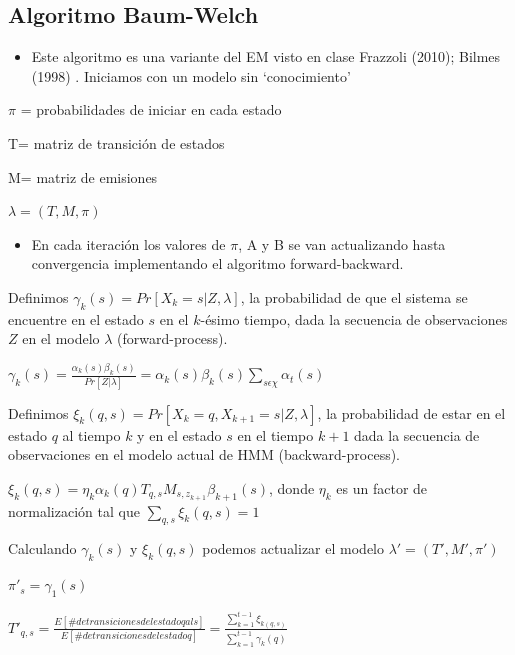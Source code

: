 \documentclass[]{article}
\begin{document}
\subsection{Algoritmo Baum-Welch}\label{algoritmo-baum-welch}

\begin{itemize}
\itemsep1pt\parskip0pt
\item
  Este algoritmo es una variante del EM visto en clase Frazzoli (2010);
  Bilmes (1998) . Iniciamos con un modelo sin `conocimiento'
\end{itemize}

\(\pi\) = probabilidades de iniciar en cada estado

T= matriz de transición de estados

M= matriz de emisiones

\(\lambda=(T,M,\pi)\)

\begin{itemize}
\itemsep1pt\parskip0pt
\item
  En cada iteración los valores de \(\pi\), A y B se van actualizando
  hasta convergencia implementando el algoritmo forward-backward.
\end{itemize}

Definimos \(\gamma_{k}(s)=Pr[X_{k}= s|Z,\lambda]\), la probabilidad de
que el sistema se encuentre en el estado \(s\) en el \(k\)-ésimo tiempo,
dada la secuencia de observaciones \(Z\) en el modelo \(\lambda\)
(forward-process).

\(\gamma_{k}(s)=\frac{\alpha_{k}(s)\beta_{k}(s)}{Pr[Z|\lambda]}=\alpha_{k}(s)\beta_{k}(s){\sum_{s\epsilon\chi}\alpha_{t}(s)}\)

Definimos \(\xi_{k}(q,s)=Pr[X_{k}=q,X_{k+1}=s|Z,\lambda]\), la
probabilidad de estar en el estado \(q\) al tiempo \(k\) y en el estado
\(s\) en el tiempo \(k+1\) dada la secuencia de observaciones en el
modelo actual de HMM (backward-process).

\(\xi_{k}(q,s)=\eta_{k}\alpha_{k}(q)T_{q,s}M_{s,z_{k+1}}\beta_{k+1}(s)\),
donde \(\eta_{k}\) es un factor de normalización tal que
\(\sum_{q,s}\xi_{k}(q,s)=1\)

Calculando \(\gamma_{k}(s)\) y \(\xi_{k}(q,s)\) podemos actualizar el
modelo \(\lambda'=(T',M',\pi')\)

\(\pi'_{s}=\gamma_{1}(s)\)

\(T'_{q,s}=\frac{E[\# de transiciones del estado q al s]}{E[\# de transiciones del estado q]}=\frac{\sum_{k=1}^{t-1}\xi_{k(q,s)}}{\sum_{k=1}^{t-1}\gamma_{k}(q)}\)
\end{document}
